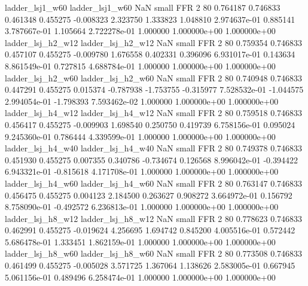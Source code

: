          ladder_lsj1_w60          ladder_lsj1_w60                   NaN      small      FFR                 2 80 0.764187       0.746833 0.461348       0.455275   -0.008323      2.323750      1.333823     1.048810   2.974637e-01  0.885141 3.787667e-01     1.105664   2.722278e-01            1.000000    1.000000e+00        1.000000e+00
       ladder_lsj_h2_w12        ladder_lsj_h2_w12                   NaN      small      FFR                 2 80 0.759354       0.746833 0.457107       0.455275   -0.009780      1.676558      0.402331     0.396096   6.931017e-01  0.143634 8.861549e-01     0.727815   4.688784e-01            1.000000    1.000000e+00        1.000000e+00
       ladder_lsj_h2_w60        ladder_lsj_h2_w60                   NaN      small      FFR                 2 80 0.740948       0.746833 0.447291       0.455275    0.015374     -0.787938     -1.753755    -0.315977   7.528532e-01 -1.044575 2.994054e-01    -1.798393   7.593462e-02            1.000000    1.000000e+00        1.000000e+00
       ladder_lsj_h4_w12        ladder_lsj_h4_w12                   NaN      small      FFR                 2 80 0.759518       0.746833 0.456417       0.455275   -0.009903      1.698540      0.250750     0.419739   6.758156e-01  0.095024 9.245360e-01     0.786444   4.339599e-01            1.000000    1.000000e+00        1.000000e+00
       ladder_lsj_h4_w40        ladder_lsj_h4_w40                   NaN      small      FFR                 2 80 0.749378       0.746833 0.451930       0.455275    0.007355      0.340786     -0.734674     0.126568   8.996042e-01 -0.394422 6.943321e-01    -0.815618   4.171708e-01            1.000000    1.000000e+00        1.000000e+00
       ladder_lsj_h4_w60        ladder_lsj_h4_w60                   NaN      small      FFR                 2 80 0.763147       0.746833 0.456475       0.455275    0.004123      2.184500      0.263627     0.908272   3.664972e-01  0.156792 8.758090e-01    -0.492572   6.236813e-01            1.000000    1.000000e+00        1.000000e+00
       ladder_lsj_h8_w12        ladder_lsj_h8_w12                   NaN      small      FFR                 2 80 0.778623       0.746833 0.462991       0.455275   -0.019624      4.256695      1.694742     0.845200   4.005516e-01  0.572442 5.686478e-01     1.333451   1.862159e-01            1.000000    1.000000e+00        1.000000e+00
       ladder_lsj_h8_w60        ladder_lsj_h8_w60                   NaN      small      FFR                 2 80 0.773508       0.746833 0.461499       0.455275   -0.005028      3.571725      1.367064     1.138626   2.583005e-01  0.667945 5.061156e-01     0.489496   6.258474e-01            1.000000    1.000000e+00        1.000000e+00
